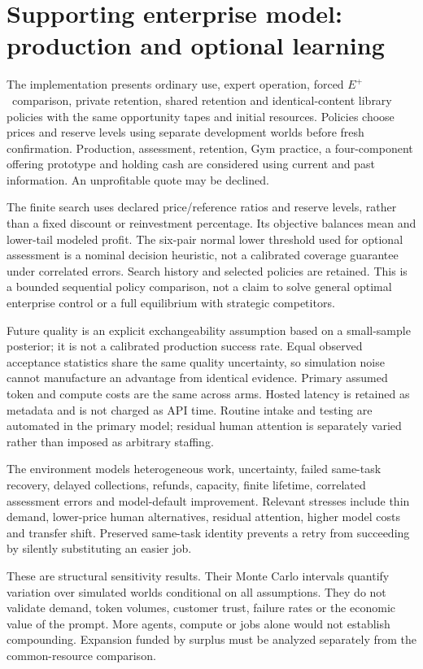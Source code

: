 \documentclass[11pt,letterpaper]{article}
\newcommand{\Eplus}{\ensuremath{E^{+}}}
\begin{document}
\section{Supporting enterprise model: production and optional learning}
The implementation presents ordinary use, expert operation, forced \Eplus\ comparison, private retention, shared retention and identical-content library policies with the same opportunity tapes and initial resources. Policies choose prices and reserve levels using separate development worlds before fresh confirmation. Production, assessment, retention, Gym practice, a four-component offering prototype and holding cash are considered using current and past information. An unprofitable quote may be declined.

The finite search uses declared price/reference ratios and reserve levels, rather than a fixed discount or reinvestment percentage. Its objective balances mean and lower-tail modeled profit. The six-pair normal lower threshold used for optional assessment is a nominal decision heuristic, not a calibrated coverage guarantee under correlated errors. Search history and selected policies are retained. This is a bounded sequential policy comparison, not a claim to solve general optimal enterprise control or a full equilibrium with strategic competitors.

Future quality is an explicit exchangeability assumption based on a small-sample posterior; it is not a calibrated production success rate. Equal observed acceptance statistics share the same quality uncertainty, so simulation noise cannot manufacture an advantage from identical evidence. Primary assumed token and compute costs are the same across arms. Hosted latency is retained as metadata and is not charged as API time. Routine intake and testing are automated in the primary model; residual human attention is separately varied rather than imposed as arbitrary staffing.

The environment models heterogeneous work, uncertainty, failed same-task recovery, delayed collections, refunds, capacity, finite lifetime, correlated assessment errors and model-default improvement. Relevant stresses include thin demand, lower-price human alternatives, residual attention, higher model costs and transfer shift. Preserved same-task identity prevents a retry from succeeding by silently substituting an easier job.




These are structural sensitivity results. Their Monte Carlo intervals quantify variation over simulated worlds conditional on all assumptions. They do not validate demand, token volumes, customer trust, failure rates or the economic value of the prompt. More agents, compute or jobs alone would not establish compounding. Expansion funded by surplus must be analyzed separately from the common-resource comparison.
\end{document}
